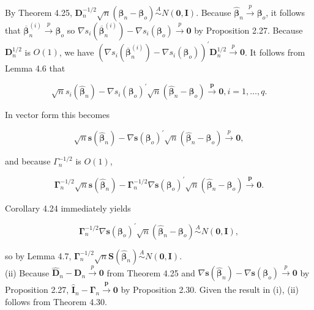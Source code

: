 \documentclass[10pt]{article}
\begin{document}
By Theorem 4.25, $\mathbf{D}_{n}^{-1 / 2} \sqrt{n}\left(\hat{\boldsymbol{\beta}}_{n}-\boldsymbol{\beta}_{o}\right) \stackrel{A}{\sim} N(\mathbf{0}, \mathbf{I})$. Because $\hat{\boldsymbol{\beta}}_{n} \xrightarrow{p} \boldsymbol{\beta}_{o}$, it follows that $\overline{\boldsymbol{\beta}}_{n}^{(i)} \xrightarrow{p} \boldsymbol{\beta}_{o}$ so $\nabla s_{i}\left(\overline{\boldsymbol{\beta}}_{n}^{(i)}\right)-\nabla s_{i}\left(\boldsymbol{\beta}_{o}\right) \xrightarrow{p} \mathbf{0}$ by Proposition 2.27. Because $\mathbf{D}_{n}^{1 / 2}$ is $O(1)$, we have $\left(\nabla s_{i}\left(\overline{\boldsymbol{\beta}}_{n}^{(i)}\right)-\nabla s_{i}\left(\boldsymbol{\beta}_{o}\right)\right)^{\prime} \mathbf{D}_{n}^{1 / 2} \xrightarrow{p} \mathbf{0}$. It follows from Lemma 4.6 that

$$
\sqrt{n} s_{i}\left(\hat{\boldsymbol{\beta}}_{n}\right)-\nabla s_{i}\left(\boldsymbol{\beta}_{o}\right)^{\prime} \sqrt{n}\left(\hat{\boldsymbol{\beta}}_{n}-\boldsymbol{\beta}_{o}\right) \xrightarrow{\boldsymbol{p}} \mathbf{0}, i=1, \ldots, q .
$$

In vector form this becomes

$$
\sqrt{n} \mathbf{s}\left(\hat{\boldsymbol{\beta}}_{n}\right)-\nabla \mathbf{s}\left(\boldsymbol{\beta}_{o}\right)^{\prime} \sqrt{n}\left(\hat{\boldsymbol{\beta}}_{n}-\boldsymbol{\beta}_{o}\right) \xrightarrow{p} \mathbf{0},
$$

and because $\Gamma_{n}^{-1 / 2}$ is $O(1)$,

$$
\boldsymbol{\Gamma}_{n}^{-1 / 2} \sqrt{n} \mathbf{s}\left(\hat{\boldsymbol{\beta}}_{n}\right)-\boldsymbol{\Gamma}_{n}^{-1 / 2} \nabla \mathbf{s}\left(\boldsymbol{\beta}_{o}\right)^{\prime} \sqrt{n}\left(\hat{\boldsymbol{\beta}}_{n}-\boldsymbol{\beta}_{o}\right) \xrightarrow{\boldsymbol{p}} \mathbf{0} .
$$

Corollary 4.24 immediately yields

$$
\boldsymbol{\Gamma}_{n}^{-1 / 2} \nabla \mathbf{s}\left(\boldsymbol{\beta}_{o}\right)^{\prime} \sqrt{n}\left(\hat{\boldsymbol{\beta}}_{n}-\boldsymbol{\beta}_{o}\right) \stackrel{A}{\sim} N(\mathbf{0}, \mathbf{I}),
$$

so by Lemma 4.7, $\boldsymbol{\Gamma}_{n}^{-1 / 2} \sqrt{n} \mathbf{S}\left(\hat{\boldsymbol{\beta}}_{n}\right) \stackrel{A}{\sim} N(\mathbf{0}, \mathbf{I})$.\\
(ii) Because $\hat{\mathbf{D}}_{n}-\mathbf{D}_{n} \xrightarrow{p} \mathbf{0}$ from Theorem 4.25 and $\nabla \mathbf{s}\left(\hat{\boldsymbol{\beta}}_{n}\right)-\nabla \mathbf{s}\left(\boldsymbol{\beta}_{o}\right) \xrightarrow{p} \mathbf{0}$ by Proposition 2.27, $\hat{\mathbf{I}}_{n}-\boldsymbol{\Gamma}_{n} \xrightarrow{\boldsymbol{p}} \mathbf{0}$ by Proposition 2.30. Given the result in (i), (ii) follows from Theorem 4.30.
\end{document}
